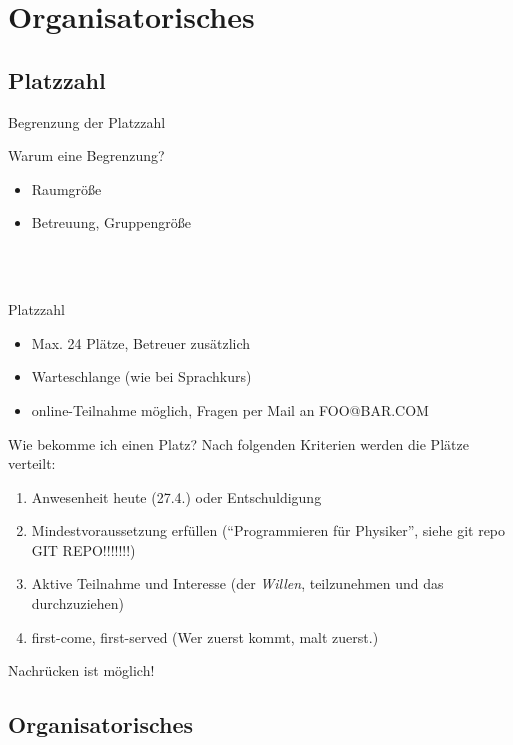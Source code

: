 \section{Organisatorisches}


\subsection{Platzzahl}

\begin{frame}{Begrenzung der Platzzahl}
	\begin{block}{Warum eine Begrenzung?}
		\begin{itemize}
			\item Raumgröße
			\item Betreuung, Gruppengröße
		\end{itemize}
	\end{block}
	\ \\
	\pause
	\ \\
	\begin{block}{Platzzahl}
		\begin{itemize}
			\item Max. 24 Plätze, Betreuer zusätzlich
			\item Warteschlange (wie bei Sprachkurs)
			\item online-Teilnahme möglich, Fragen per Mail an FOO@BAR.COM 
		\end{itemize}
	\end{block}
\end{frame}

\begin{frame}{Wie bekomme ich einen Platz?}
	Nach folgenden Kriterien werden die Plätze verteilt:
	\begin{enumerate}
		\item Anwesenheit heute (27.4.) oder Entschuldigung
		\item Mindestvoraussetzung erfüllen (\enquote{Programmieren für Physiker}, siehe git repo GIT REPO!!!!!!!)
		\item Aktive Teilnahme und Interesse (der \emph{Willen}, teilzunehmen und das durchzuziehen)
		\item first-come, first-served (Wer zuerst kommt, malt zuerst.)
	\end{enumerate}
	
	Nachrücken ist möglich!
\end{frame}



\subsection{Organisatorisches}

